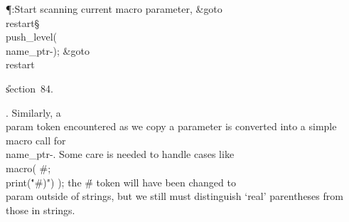\Y\P\?\4:Start scanning current macro parameter, \&{goto}\8\\{restart}\X\S%
\?\6
\\{push\_level}\?\1(\?\\{name\_ptr}\?-\?\2)\?;\5
\&{goto}\8\\{restart}\par
\U section~84.\fi

. Similarly, a \\{param} token encountered as we copy a parameter is
converted
into a simple macro call for \\{name\_ptr}\?-. Some care is needed to handle
cases like \\{macro}\?(\? \#; \\{print}\?(\?\.{"\#)"}\?)\? \?)\?; the \.{\#}
token will have been
changed to \\{param} outside of strings, but we still must distinguish `real'
parentheses from those in strings.

